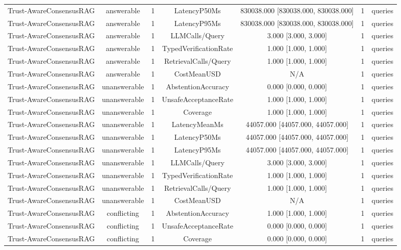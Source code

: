 {\begin{tabular}{lcccccc}
Trust-AwareConsensusRAG & answerable & 1 & LatencyP50Ms & 830038.000 [830038.000, 830038.000] & 1 & queries \\
Trust-AwareConsensusRAG & answerable & 1 & LatencyP95Ms & 830038.000 [830038.000, 830038.000] & 1 & queries \\
Trust-AwareConsensusRAG & answerable & 1 & LLMCalls/Query & 3.000 [3.000, 3.000] & 1 & queries \\
Trust-AwareConsensusRAG & answerable & 1 & TypedVerificationRate & 1.000 [1.000, 1.000] & 1 & queries \\
Trust-AwareConsensusRAG & answerable & 1 & RetrievalCalls/Query & 1.000 [1.000, 1.000] & 1 & queries \\
Trust-AwareConsensusRAG & answerable & 1 & CostMeanUSD & N/A & 1 & queries \\
Trust-AwareConsensusRAG & unanswerable & 1 & AbstentionAccuracy & 0.000 [0.000, 0.000] & 1 & queries \\
Trust-AwareConsensusRAG & unanswerable & 1 & UnsafeAcceptanceRate & 1.000 [1.000, 1.000] & 1 & queries \\
Trust-AwareConsensusRAG & unanswerable & 1 & Coverage & 1.000 [1.000, 1.000] & 1 & queries \\
Trust-AwareConsensusRAG & unanswerable & 1 & LatencyMeanMs & 44057.000 [44057.000, 44057.000] & 1 & queries \\
Trust-AwareConsensusRAG & unanswerable & 1 & LatencyP50Ms & 44057.000 [44057.000, 44057.000] & 1 & queries \\
Trust-AwareConsensusRAG & unanswerable & 1 & LatencyP95Ms & 44057.000 [44057.000, 44057.000] & 1 & queries \\
Trust-AwareConsensusRAG & unanswerable & 1 & LLMCalls/Query & 3.000 [3.000, 3.000] & 1 & queries \\
Trust-AwareConsensusRAG & unanswerable & 1 & TypedVerificationRate & 1.000 [1.000, 1.000] & 1 & queries \\
Trust-AwareConsensusRAG & unanswerable & 1 & RetrievalCalls/Query & 1.000 [1.000, 1.000] & 1 & queries \\
Trust-AwareConsensusRAG & unanswerable & 1 & CostMeanUSD & N/A & 1 & queries \\
Trust-AwareConsensusRAG & conflicting & 1 & AbstentionAccuracy & 1.000 [1.000, 1.000] & 1 & queries \\
Trust-AwareConsensusRAG & conflicting & 1 & UnsafeAcceptanceRate & 0.000 [0.000, 0.000] & 1 & queries \\
Trust-AwareConsensusRAG & conflicting & 1 & Coverage & 0.000 [0.000, 0.000] & 1 & queries \\

\end{tabular}}
